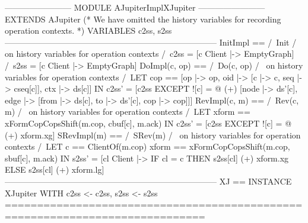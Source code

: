 \documentclass[preview, border={5pt 0pt 35pt 1pt}]{standalone}
\begin{document}
\begin{tla}
------------------------ MODULE AJupiterImplXJupiter ------------------------
EXTENDS AJupiter
(* We have omitted the history variables for recording operation contexts. *)
VARIABLES c2ss, s2ss
-----------------------------------------------------------------------------
InitImpl == /\ Init
            /\ \* on history variables for operation contexts
            /\ c2ss = [c \in Client |-> EmptyGraph]
            /\ s2ss = [c \in Client |-> EmptyGraph]
DoImpl(c, op) == /\ Do(c, op)
                 /\ \* on history variables for operation contexts
                 /\ LET cop == [op |-> op, oid |-> [c |-> c, seq |-> cseq[c]], ctx |-> ds[c]]
                    IN  c2ss' = [c2ss EXCEPT ![c] = 
                          @ (+) [node |-> {ds'[c]},
                                 edge |-> {[from |-> ds[c], to |-> ds'[c], cop |-> cop]}]]
RevImpl(c, m) == /\ Rev(c, m)
                 /\ \* on history variables for operation contexts
                 /\ LET xform == xFormCopCopsShift(m.cop, cbuf[c], m.ack)
                    IN  c2ss' = [c2ss EXCEPT ![c] = @ (+) xform.xg]
SRevImpl(m) == /\ SRev(m)
               /\ \* on history variables for operation contexts
               /\ LET c == ClientOf(m.cop)
                  xform == xFormCopCopsShift(m.cop, sbuf[c], m.ack)
                  IN  s2ss' = [cl \in Client |-> IF cl = c THEN s2ss[cl] (+) xform.xg
                                                           ELSE s2ss[cl] (+) xform.lg]
-----------------------------------------------------------------------------
XJ == INSTANCE XJupiter WITH c2ss <- c2ss, s2ss <- s2ss
=============================================================================
\end{tla}
\end{document}
